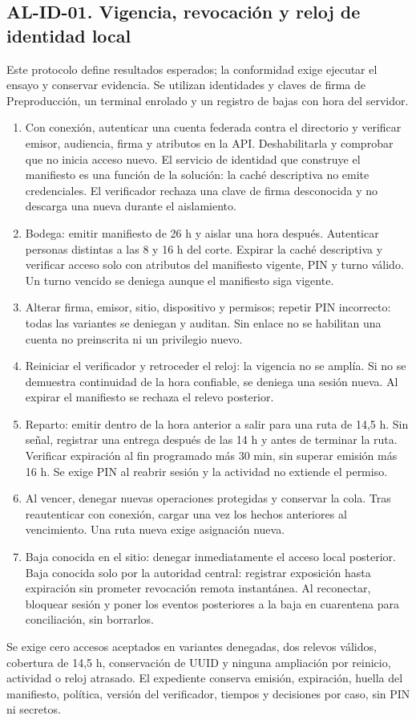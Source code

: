 \subsection*{AL-ID-01. Vigencia, revocación y reloj de identidad local}
\label{prueba:al-id-01}
Este protocolo define resultados esperados; la conformidad exige ejecutar el ensayo y conservar evidencia. Se utilizan identidades y claves de firma de Preproducción, un terminal enrolado y un registro de bajas con hora del servidor.
\begin{enumerate}
\item Con conexión, autenticar una cuenta federada contra el directorio y verificar emisor, audiencia, firma y atributos en la API. Deshabilitarla y comprobar que no inicia acceso nuevo. El servicio de identidad que construye el manifiesto es una función de la solución: la caché descriptiva no emite credenciales. El verificador rechaza una clave de firma desconocida y no descarga una nueva durante el aislamiento.
\item Bodega: emitir manifiesto de 26 h y aislar una hora después. Autenticar personas distintas a las 8 y 16 h del corte. Expirar la caché descriptiva y verificar acceso solo con atributos del manifiesto vigente, PIN y turno válido. Un turno vencido se deniega aunque el manifiesto siga vigente.
\item Alterar firma, emisor, sitio, dispositivo y permisos; repetir PIN incorrecto: todas las variantes se deniegan y auditan. Sin enlace no se habilitan una cuenta no preinscrita ni un privilegio nuevo.
\item Reiniciar el verificador y retroceder el reloj: la vigencia no se amplía. Si no se demuestra continuidad de la hora confiable, se deniega una sesión nueva. Al expirar el manifiesto se rechaza el relevo posterior.
\item Reparto: emitir dentro de la hora anterior a salir para una ruta de 14,5 h. Sin señal, registrar una entrega después de las 14 h y antes de terminar la ruta. Verificar expiración al fin programado más 30 min, sin superar emisión más 16 h. Se exige PIN al reabrir sesión y la actividad no extiende el permiso.
\item Al vencer, denegar nuevas operaciones protegidas y conservar la cola. Tras reautenticar con conexión, cargar una vez los hechos anteriores al vencimiento. Una ruta nueva exige asignación nueva.
\item Baja conocida en el sitio: denegar inmediatamente el acceso local posterior. Baja conocida solo por la autoridad central: registrar exposición hasta expiración sin prometer revocación remota instantánea. Al reconectar, bloquear sesión y poner los eventos posteriores a la baja en cuarentena para conciliación, sin borrarlos.
\end{enumerate}
Se exige cero accesos aceptados en variantes denegadas, dos relevos válidos, cobertura de 14,5 h, conservación de UUID y ninguna ampliación por reinicio, actividad o reloj atrasado. El expediente conserva emisión, expiración, huella del manifiesto, política, versión del verificador, tiempos y decisiones por caso, sin PIN ni secretos.

